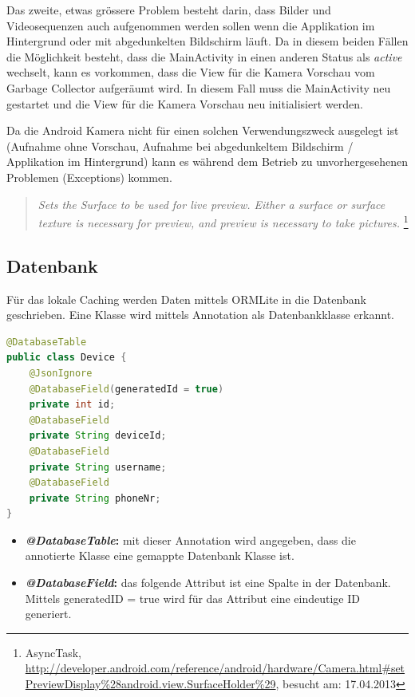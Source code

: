 Das zweite, etwas grössere Problem besteht darin, dass Bilder und Videosequenzen auch aufgenommen werden sollen wenn die Applikation im Hintergrund oder mit abgedunkelten Bildschirm läuft. Da in diesem beiden Fällen die Möglichkeit besteht, dass die MainActivity in einen anderen Status als \textit{active} wechselt, kann es vorkommen, dass die View für die Kamera Vorschau vom Garbage Collector aufgeräumt wird. In diesem Fall muss die MainActivity neu gestartet und die View für die Kamera Vorschau neu initialisiert werden. 

Da die Android Kamera nicht für einen solchen Verwendungszweck ausgelegt ist (Aufnahme ohne Vorschau, Aufnahme bei abgedunkeltem Bildschirm / Applikation im Hintergrund) kann es während dem Betrieb zu unvorhergesehenen Problemen (Exceptions) kommen.


\begin{quotation}
\textit{Sets the Surface to be used for live preview. Either a surface or surface texture is necessary for preview, and preview is necessary to take pictures.} \footnote{AsyncTask, \url{http://developer.android.com/reference/android/hardware/Camera.html\#setPreviewDisplay\%28android.view.SurfaceHolder\%29}, besucht am: 17.04.2013}
\end{quotation}



\subsection{Datenbank}
Für das lokale Caching werden Daten mittels ORMLite in die Datenbank geschrieben. Eine Klasse wird mittels Annotation als Datenbankklasse erkannt.

\begin{lstlisting}[language=Java, caption=ORMLite Annotations]
@DatabaseTable
public class Device {
	@JsonIgnore
	@DatabaseField(generatedId = true)
	private int id;
	@DatabaseField
	private String deviceId;
	@DatabaseField
	private String username;
	@DatabaseField
	private String phoneNr;
}
\end{lstlisting}

\begin{itemize}
\item \textbf{\textit{@DatabaseTable}:} mit dieser Annotation wird angegeben, dass die annotierte Klasse  eine gemappte Datenbank Klasse ist.
\item \textbf{\textit{@DatabaseField}:} das folgende Attribut ist eine Spalte in der Datenbank. Mittels generatedID = true wird für das Attribut eine eindeutige ID generiert.
\end{itemize}


